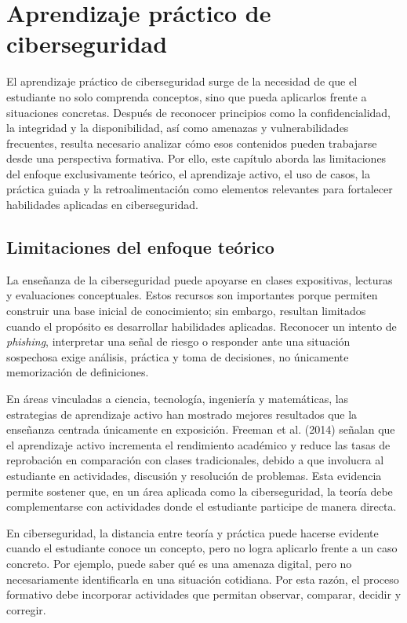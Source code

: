 \section{Aprendizaje práctico de ciberseguridad}

El aprendizaje práctico de ciberseguridad surge de la necesidad de que el estudiante no solo comprenda conceptos, sino que pueda aplicarlos frente a situaciones concretas. Después de reconocer principios como la confidencialidad, la integridad y la disponibilidad, así como amenazas y vulnerabilidades frecuentes, resulta necesario analizar cómo esos contenidos pueden trabajarse desde una perspectiva formativa. Por ello, este capítulo aborda las limitaciones del enfoque exclusivamente teórico, el aprendizaje activo, el uso de casos, la práctica guiada y la retroalimentación como elementos relevantes para fortalecer habilidades aplicadas en ciberseguridad.

\subsection{Limitaciones del enfoque teórico}

La enseñanza de la ciberseguridad puede apoyarse en clases expositivas, lecturas y evaluaciones conceptuales. Estos recursos son importantes porque permiten construir una base inicial de conocimiento; sin embargo, resultan limitados cuando el propósito es desarrollar habilidades aplicadas. Reconocer un intento de \textit{phishing}, interpretar una señal de riesgo o responder ante una situación sospechosa exige análisis, práctica y toma de decisiones, no únicamente memorización de definiciones.

En áreas vinculadas a ciencia, tecnología, ingeniería y matemáticas, las estrategias de aprendizaje activo han mostrado mejores resultados que la enseñanza centrada únicamente en exposición. Freeman et al. (2014) señalan que el aprendizaje activo incrementa el rendimiento académico y reduce las tasas de reprobación en comparación con clases tradicionales, debido a que involucra al estudiante en actividades, discusión y resolución de problemas. Esta evidencia permite sostener que, en un área aplicada como la ciberseguridad, la teoría debe complementarse con actividades donde el estudiante participe de manera directa.

En ciberseguridad, la distancia entre teoría y práctica puede hacerse evidente cuando el estudiante conoce un concepto, pero no logra aplicarlo frente a un caso concreto. Por ejemplo, puede saber qué es una amenaza digital, pero no necesariamente identificarla en una situación cotidiana. Por esta razón, el proceso formativo debe incorporar actividades que permitan observar, comparar, decidir y corregir.

